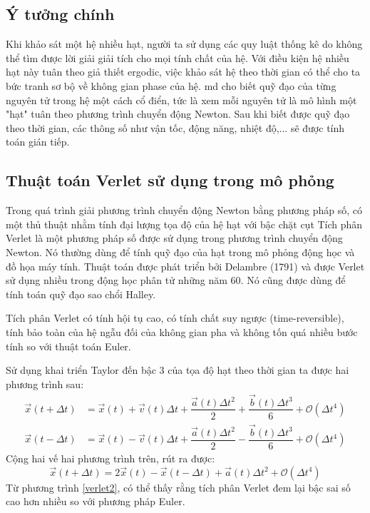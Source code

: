 \documentclass[12pt,a4paper,reqno, oneside]{book}
\begin{document}
	\subsection{Ý tưởng chính}
	
	Khi khảo sát một hệ nhiều hạt, người ta sử dụng các quy luật thống kê do không thể tìm được lời giải giải tích cho mọi tính chất của hệ. Với điều kiện hệ nhiều hạt này tuân theo giả thiết ergodic, việc khảo sát hệ theo thời gian có thể cho ta bức tranh sơ bộ về không gian phase của hệ.
	\Gls{md} cho biết quỹ đạo của từng nguyên tử trong hệ một cách cổ điển, tức là xem mỗi nguyên tử là mô hình một "hạt" tuân theo phương trình chuyển động Newton. Sau khi biết được quỹ đạo theo thời gian, các thông số như vận tốc, động năng, nhiệt độ,... sẽ được tính toán gián tiếp.
	\subsection{Thuật toán Verlet sử dụng trong mô phỏng}
	
		Trong quá trình giải phương trình chuyển động Newton bằng phương pháp số, có một thủ thuật nhằm tính đại lượng tọa độ của hệ hạt với bậc chặt cụt
		Tích phân Verlet\cite{Verlet1967} là một phương pháp số được sử dụng trong phương trình chuyển động Newton. Nó thường dùng để tính quỹ đạo của hạt trong mô phỏng động học và đồ họa máy tính. Thuật toán được phát triển bởi Delambre (1791) và được Verlet sử dụng nhiều trong động học phân tử những năm 60. Nó cũng được dùng để tính toán quỹ đạo sao chổi Halley.
			
		Tích phân Verlet có tính hội tụ cao, có tính chất suy ngược (time-reversible), tính bảo toàn của hệ ngẫu đối của không gian pha và không tốn quá nhiều bước tính so với thuật toán Euler.
			
		Sử dụng khai triển Taylor đến bậc 3 của tọa độ hạt theo thời gian ta được hai phương trình sau:
		\begin{align}
		\vec{x}\left(t+\Delta t\right) &=\vec{x}\left(t\right)+\vec{v}\left(t\right)\Delta t + \dfrac{\vec{a}\left(t\right)\Delta t^{2}}{2} + \dfrac{\vec{b}\left(t\right)\Delta t^{3}}{6} + \mathcal{O}\left(\Delta t^{4}\right)\\
		\vec{x}\left(t-\Delta t\right) &=\vec{x}\left(t\right)-\vec{v}\left(t\right)\Delta t + \dfrac{\vec{a}\left(t\right)\Delta t^{2}}{2} - \dfrac{\vec{b}\left(t\right)\Delta t^{3}}{6} + \mathcal{O}\left(\Delta t^{4}\right)
		\label{verlet1}
		\end{align}
		Cộng hai vế hai phương trình trên, rút ra được:
		\begin{equation}
		\vec{x}\left(t+\Delta t\right)=2\vec{x}\left(t\right)-\vec{x}\left(t-\Delta t\right)+\vec{a}\left(t\right)\Delta t^{2}+\mathcal{O}\left(\Delta t^{4}\right)
		\label{verlet2}
		\end{equation}
		Từ phương trình \eqref{verlet2}, có thể thấy rằng tích phân Verlet đem lại bậc sai số cao hơn nhiều so với phương pháp Euler.
\end{document}
